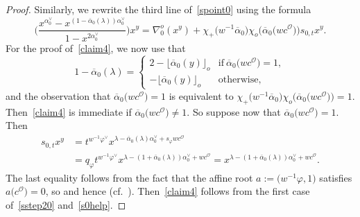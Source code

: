 \begin{proof}
Similarly, we rewrite the third line of~\eqref{spoint0} using the formula
\begin{equation}\label{claim4}
\Biggl(\frac{x^{\alpha_0^\vee}-x^{(1-\overline{\alpha}_0(\lambda))\alpha_0^\vee}}{1-x^{2\alpha_0^\vee}}\Biggr)x^y=
\nabla_0^o(x^y)+
\chi_+\bigl(w^{-1}\overline{\alpha}_0\bigr)\chi_o\bigl(\overline{\alpha}_0\bigl(wc^\mathcal{O}\bigr)\bigr)
s_{0,t}x^y.
\end{equation}
For the proof of~\eqref{claim4}, we now use that
\begin{equation}\label{sstep20}
1-\overline{\alpha}_0(\lambda)=
\begin{cases}
2-\lfloor\overline{\alpha}_0(y)\rfloor_o &\text{if}\ \overline{\alpha}_0\bigl(wc^\mathcal{O}\bigr)=1,\\
-\lfloor\overline{\alpha}_0(y)\rfloor_o &\text{otherwise},
\end{cases}
\end{equation}
and the observation that $\overline{\alpha}_0\bigl(wc^\mathcal{O}\bigr)=1$ is equivalent to
$\chi_+\bigl(w^{-1}\overline{\alpha}_0\bigr)\chi_o\bigl(\overline{\alpha}_0\bigl(wc^\mathcal{O}\bigr)\bigr)\!=\!1$. Then~\eqref{claim4} is immediate if $\overline{\alpha}_0\bigl(wc^\mathcal{O}\bigr)\not=1$.
So suppose now that $\overline{\alpha}_0\bigl(wc^\mathcal{O}\bigr)=1$. Then
\begin{align}
s_{0,t}x^y
&=t^{w^{-1}\varphi^\vee}x^{\lambda-\overline{\alpha}_0(\lambda)\alpha_0^\vee+s_\varphi wc^\mathcal{O}}\nonumber\\
&=q_\varphi t^{w^{-1}\varphi^\vee}x^{\lambda-(1+\overline{\alpha}_0(\lambda))\alpha_0^\vee+wc^\mathcal{O}}=
x^{\lambda-(1+\overline{\alpha}_0(\lambda))\alpha_0^\vee+wc^\mathcal{O}}.\label{s0help}
\end{align}
The last equality follows from the fact that the affine root $a:=\bigl(w^{-1}\varphi,1\bigr)$ satisfies $a\bigl(c^\mathcal{O}\bigr)=0$, so  and hence
 (cf.~\cite[Lemma 3.4]{SSV2}). Then~\eqref{claim4} follows from the first case of~\eqref{sstep20} and~\eqref{s0help}.



\end{proof}
